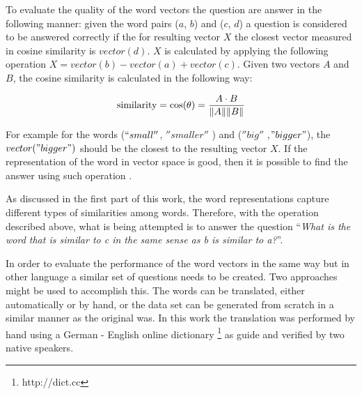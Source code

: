To evaluate the quality of the word vectors the question  are answer in the
following manner: given the word pairs ($a$, $b$) and ($c$, $d$) a question
is considered to be answered correctly if the for resulting vector $X$ the closest vector measured in
cosine similarity is  $vector(d)$. $X$ is calculated by applying the following
operation $X = vector(b) - vector(a) + vector(c)$.  Given two vectors $A$ and $B$, the
cosine similarity is calculated in the following way: 

$$\text{similarity} = \cos(\theta) = {A \cdot B \over \|A\| \|B\|}$$


 For example  for the words
($``small''$, $''smaller''$ ) and ($''big''$ ,$"bigger"$),
the $vector("bigger")$ should be the closest to the resulting
vector $X$. If the representation of the word in
vector space is good, then it is possible to find the answer using such
operation \cite{DBLP:journals/corr/abs-1301-3781}.

As discussed in the first part of this work, the word representations
capture different types of  similarities among words. Therefore, with the
operation described above,  what is  being
attempted is to answer the question ``\emph{What is the word that is similar to
c in the same sense as b is similar to a?}''. 


In order to evaluate the performance of the word vectors in the same way but in other language a
similar set of questions  needs to be created. Two approaches might be used
to accomplish this. The words can be translated, either automatically or by hand, or the data set can be
generated from scratch in a similar manner as the original was.  In this work
the translation was performed by hand using a German - English online dictionary \footnote{http://dict.cc} as guide and
verified by two native speakers.


